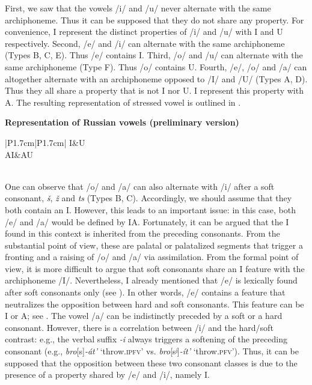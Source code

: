 \documentclass[output=paper,
modfonts,
newtxmath,
hidelinks,
]{langscibook}
\begin{document}
First, we saw that the vowels /i/ and /u/ never alternate with the same archiphoneme. Thus it can be supposed that they do not share any property. For convenience, I represent the distinct properties of /i/ and /u/ with {\textbar}I{\textbar} and {\textbar}U{\textbar} respectively. Second, /e/ and /i/ can alternate with the same archiphoneme (Types B, C, E). Thus /e/ contains {\textbar}I{\textbar}. Third, /o/ and /u/ can alternate with the same archiphoneme (Type F). Thus /o/ contains {\textbar}U{\textbar}. Fourth, /e/, /o/ and /a/ can altogether alternate with an archiphoneme opposed to /I/ and /U/ (Types A, D). Thus they all share a property that is not {\textbar}I{\textbar} nor {\textbar}U{\textbar}. I represent this property with {\textbar}A{\textbar}. The resulting representation of stressed vowel is outlined in .

\ea \textbf{Representation of Russian vowels (preliminary version)}\label{19}\\\medskip
\begin{tabular}{|P{1.7cm}|P{1.7cm}|}
\hline
\textbar I\textbar&\textbar U\textbar\\\hline
\textbar AI\textbar&\textbar AU\textbar\\\hline
{}\\\hline
\end{tabular}
\z

\noindent One can observe that /o/ and /a/ can also alternate with /i/ after a soft consonant, \textit{š}, \textit{ž} and \textit{ts} (Types B, C). Accordingly, we should assume that they both contain an {\textbar}I{\textbar}. However, this leads to an important issue: in this case, both /e/ and /a/ would be defined by {\textbar}IA{\textbar}. Fortunately, it can be argued that the {\textbar}I{\textbar} found in this context is inherited from the preceding consonants. From the substantial point of view, these are palatal or palatalized segments that trigger a fronting and a raising of /o/ and /a/ via assimilation. From the formal point of view, it is more difficult to argue that soft consonants share an {\textbar}I{\textbar} feature with the archiphoneme /I/. Nevertheless, I already mentioned that /e/ is lexically found after soft consonants only (see ). In other words, /e/ contains a feature that neutralizes the opposition between hard and soft consonants. This feature can be {\textbar}I{\textbar} or {\textbar}A{\textbar}; see . The vowel /a/ can be indistinctly preceded by a soft or a hard consonant. However, there is a correlation between /i/ and the hard/soft contrast: e.g., the verbal suffix \textit{-i} always triggers a softening of the preceding consonant (e.g., \textit{bro}[s]\textit{{}-}\textit{át’} `throw.\textsc{ipfv}' vs. \textit{bro}[sʲ]\textit{{}-}\textit{ít’} ‘throw.\textsc{pfv}’). Thus, it can be supposed that the opposition between these two consonant classes is due to the presence of a property shared by /e/ and /i/, namely {\textbar}I{\textbar}.
\end{document}
